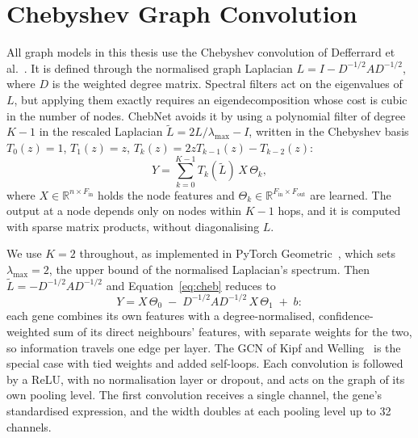 \section{Chebyshev Graph Convolution}
\label{sec:chebconv}

All graph models in this thesis use the Chebyshev convolution of Defferrard
et al.~\cite{defferrard2016chebnet}. It is defined through the normalised graph Laplacian
$L = I - D^{-1/2} A D^{-1/2}$, where $D$ is the weighted degree matrix. Spectral filters act on
the eigenvalues of $L$, but applying them exactly requires an eigendecomposition whose cost is
cubic in the number of nodes. ChebNet avoids it by using a polynomial filter of degree $K-1$ in the
rescaled Laplacian $\tilde{L} = 2L/\lambda_{\max} - I$, written in the Chebyshev basis
$T_0(z) = 1$, $T_1(z) = z$, $T_k(z) = 2zT_{k-1}(z) - T_{k-2}(z)$:
\begin{equation}
Y = \sum_{k=0}^{K-1} T_k(\tilde{L})\, X\, \Theta_k ,
\label{eq:cheb}
\end{equation}
where $X \in \mathbb{R}^{n \times F_{\mathrm{in}}}$ holds the node features and
$\Theta_k \in \mathbb{R}^{F_{\mathrm{in}} \times F_{\mathrm{out}}}$ are learned. The output at a node
depends only on nodes within $K-1$ hops, and it is computed with sparse matrix products, without
diagonalising $L$.

We use $K = 2$ throughout, as implemented in PyTorch Geometric~\cite{fey2019pyg}, which sets
$\lambda_{\max} = 2$, the upper bound of the normalised Laplacian's spectrum. Then
$\tilde{L} = -D^{-1/2} A D^{-1/2}$ and Equation~\eqref{eq:cheb} reduces to
\begin{equation}
Y = X\,\Theta_0 \;-\; D^{-1/2} A D^{-1/2}\, X\,\Theta_1 \;+\; b :
\label{eq:cheb-k2}
\end{equation}
each gene combines its own features with a degree-normalised, confidence-weighted sum of its direct
neighbours' features, with separate weights for the two, so information travels one edge per layer.
The GCN of Kipf and Welling~\cite{kipf2017gcn} is the special case with tied weights and added
self-loops. Each convolution is followed by a ReLU, with no normalisation layer or dropout, and acts
on the graph of its own pooling level. The first convolution receives a single channel, the gene's
standardised expression, and the width doubles at each pooling level up to 32 channels.

